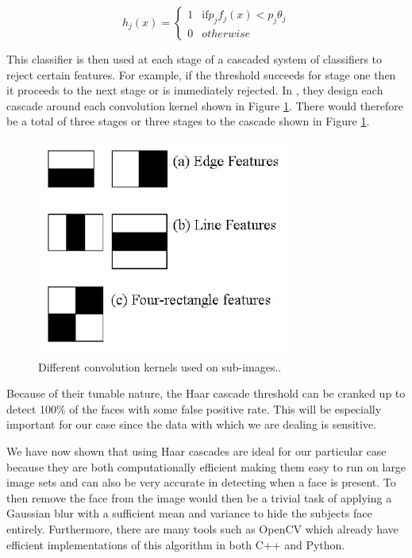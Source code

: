 \documentclass[
	submission,
	final,
	notitlepage,
	narroweqnarray,
	inline,
	twoside,
	]{ieee}
\begin{document}
\begin{equation}
   h_j(x) = \begin{cases}
     1  & \text{if} p_jf_j(x) < p_j \theta_j \\
     0 & otherwise
        \end{cases}
\end{equation}

This classifier is then used at each stage of a cascaded system of classifiers
to reject certain features. For example, if the threshold succeeds for stage one
then it proceeds to the next stage or is immediately rejected. In \cite{haar_cascades}, 
they design each cascade around each convolution kernel shown in Figure 
\ref{fig:haar_cascades}. There would therefore be a total of three stages
or three stages to the cascade shown in Figure \ref{fig:haar_cascades}.

\begin{figure}[h]
\centering
\includegraphics[width=\linewidth]{figures/haar_features}
\caption{Different convolution kernels used on sub-images..}
\label{fig:haar_cascades} 
\end{figure}

Because of their tunable nature, the Haar cascade threshold
can be cranked up to detect 100\% of the faces with some false 
positive rate. This will be especially important for our case
since the data with which we are dealing is sensitive. 

We have now shown that using Haar cascades are ideal for our 
particular case because they are both computationally efficient
making them easy to run on large image sets and can also be 
very accurate in detecting when a face is present. To then remove the face
from the image would then be a trivial task of applying a Gaussian 
blur with a sufficient mean and variance to hide the subjects face 
entirely. Furthermore, 
there are many tools such as OpenCV \cite{opencv} which already have
efficient implementations of this algorithm in both C++ and Python. 
\end{document}

